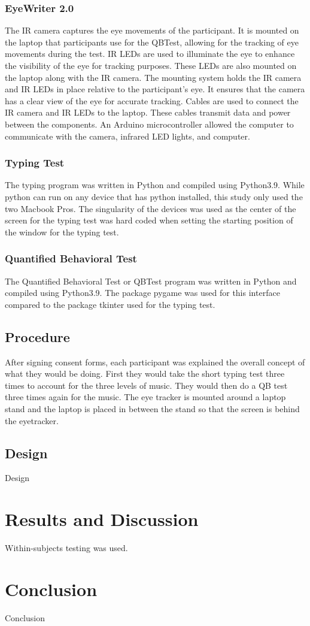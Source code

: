 \documentclass[manuscript, screen, review]{acmart} %
\begin{document}
\subsubsection{EyeWriter 2.0}
The IR camera captures the eye movements of the participant.
It is mounted on the laptop that participants use for the QBTest, allowing for the tracking of eye movements during the test.
IR LEDs are used to illuminate the eye to enhance the visibility of the eye for tracking purposes. 
These LEDs are also mounted on the laptop along with the IR camera. 
The mounting system holds the IR camera and IR LEDs in place relative to the participant's eye. 
It ensures that the camera has a clear view of the eye for accurate tracking. 
Cables are used to connect the IR camera and IR LEDs to the laptop. These cables transmit data and power between the components.
An Arduino microcontroller allowed the computer to communicate with the camera, infrared LED lights, and computer.
\subsubsection{Typing Test}
The typing program was written in Python and compiled using Python3.9. While python can run on any device that has python installed, this study only used the two Macbook Pros. The singularity of the devices was used as the center of the screen for the typing test was hard coded when setting the starting position of the window for the typing test. 

\subsubsection{Quantified Behavioral Test}
The Quantified Behavioral Test or QBTest program was written in Python and compiled using Python3.9. The package pygame was used for this interface compared to the package tkinter used for the typing test.

\subsection[short]{Procedure}
After signing consent forms, each participant was explained the overall concept of what they would be doing. First they would take the short typing test three times to account for the three levels of music. They would then do a QB test three times again for the music. The eye tracker is mounted around a laptop stand and the laptop is placed in between the stand so that the screen is behind the eyetracker.

\subsection[short]{Design}
Design

\section{Results and Discussion}
Within-subjects testing was used.

\section{Conclusion}
Conclusion



\end{document}
